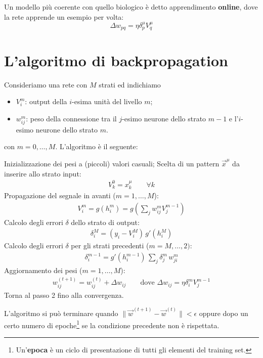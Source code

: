Un modello più coerente con quello biologico è detto apprendimento \textbf{online}, dove la rete apprende un esempio per volta:
\begin{displaymath}
	\Delta w_{pq} = \eta \delta^\mu_p V^\mu_q
\end{displaymath}

\section{L'algoritmo di backpropagation}
\label{sec:l'algoritmo}

Consideriamo una rete con $M$ strati ed indichiamo
\begin{itemize}
	\item $V^m_i$: output della $i$-esima unità del livello $m$;
	\item $w^m_{ij}$: peso della connessione tra il $j$-esimo neurone dello strato $m-1$ e l'$i$-esimo neurone dello strato $m$. 
\end{itemize}
con $m = 0, \dots, M$. L'algoritmo è il seguente:
\begin{algorithmic}[1]
	\State Inizializzazione dei pesi a (piccoli) valori casuali;
	\State Scelta di un pattern $\vec{x}^\mu$ da inserire allo strato input:
	\begin{align*}
		V^0_k = x^\mu_k \qquad \forall k
	\end{align*}
	\State Propagazione del segnale in avanti ($m = 1, \dots, M$):
	\begin{align*}
		V^m_i = g(h_i^m) = g\left(\sum_j w_{ij}^m V_j^{m-1}\right)
	\end{align*}
	\State Calcolo degli errori $\delta$ dello strato di output:
	\begin{align*}
		\delta^M_i = (y_i - V^M_i) \, g'(h^M_i)
	\end{align*}
	\State Calcolo degli errori $\delta$ per gli strati precedenti ($m = M, \dots, 2)$:
	\begin{align*}
		\delta^{m-1}_i = g'\left(h^{m-1}_i\right) \, \sum_j \delta^m_j \, w_{ji}^m
	\end{align*}
	\State Aggiornamento dei pesi ($m = 1, \dots, M$):
	\begin{align*}
		w^{(t + 1)}_{ij} = w^{(t)}_{ij} + \Delta w_{ij} \qquad \text{dove } \Delta w_{ij} = \eta \delta_i^m V_j^{m-1} 
	\end{align*}
	\State Torna al passo 2 fino alla convergenza.
\end{algorithmic}
L'algoritmo si può terminare quando $\|\vec{w}^{(t+1)} - \vec{w}^{(t)}\| < \epsilon$ oppure dopo un certo numero di epoche\footnote{Un'\textbf{epoca} è un ciclo di presentazione di tutti gli elementi del training set.} se la condizione precedente non è rispettata.

